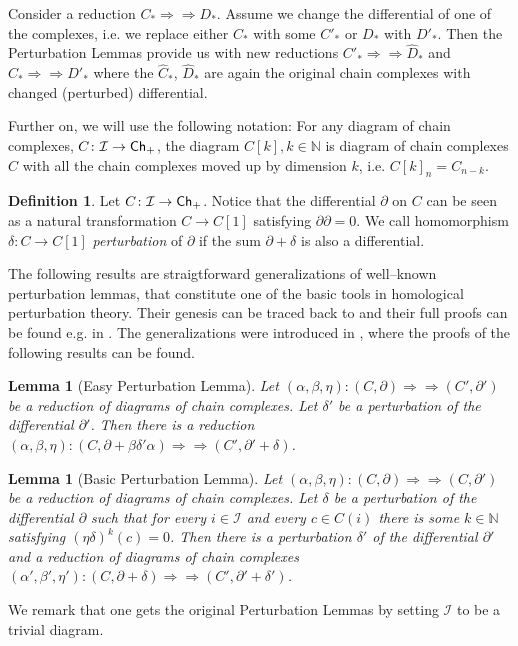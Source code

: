 \documentclass[12pt,a4wide]{article}
\theoremstyle{plain}
\newtheorem{lem}[thm]{Lemma}
\theoremstyle{definition}
\newtheorem{Def}[thm]{Definition}
\newcommand{\heading}[1]{\vspace{1ex}\par\noindent{\bf\boldmath #1}}
\renewcommand\:{\colon}
\def\bo{\partial} %
\newcommand{\dC}{{C}}
\newcommand{\icat}{\mathcal I}
\newcommand\Redu{\Rightarrow\!\!\!\!\Rightarrow}
\begin{document}
\heading{Perturbation lemmas}


Consider a reduction $C_* \Redu D_*$. Assume we change the differential of one of the complexes, i.e. we replace either $C_*$ with some $C'_*$ or $D_*$ with $D'_*$. Then the Perturbation Lemmas provide us with new reductions $C'_* \Redu  \widehat{D}_*$ and $\widehat{C}_* \Redu  D'_*$ where the $\widehat{C}_*$, $\widehat{D}_*$ are again the original chain complexes with changed (perturbed) differential.

Further on, we will use the following notation: For any diagram of chain complexes, $\dC \: \icat \to \Ch_+$, the diagram $\dC[k], k\in \mathbb{N}$ is diagram of chain complexes $\dC$ with all the chain complexes moved up by dimension $k$, i.e. $\dC[k]_n = \dC_{n-k}$.

\begin{Def}
Let $\dC \colon \icat \to \Ch_+$. Notice that the differential $\bo$ on $\dC$ can be seen as a natural transformation $\dC \to \dC [1]$ satisfying $\bo\bo = 0$. We call homomorphism $\delta : \dC \to \dC[1] $ \emph{perturbation} of $\bo$ if the sum $\bo + \delta$ is also a differential.
\end{Def}

The following results are straigtforward generalizations of well--known perturbation lemmas,  that constitute one of the basic tools in homological perturbation theory. Their genesis can be traced back to \cite{eml1, rbrown, shih} and their full proofs can be found e.g. in \cite{serg}. The generalizations were introduced in \cite{filak}, where the proofs of the following results can be found.



\begin{lem}[Easy Perturbation Lemma] \label{lem:epl}
Let $(\alpha,\beta,\eta) \colon (\dC, \bo)\Redu  (\dC',\bo')$ be a reduction of diagrams of chain complexes. Let $\delta'$ be a perturbation of the differential $\bo'$. Then there is a reduction $(\alpha,\beta,\eta) \colon (\dC, \bo + \beta \delta' \alpha) \Redu  (\dC',\bo' + \delta)$.
\end{lem}
\begin{lem}[Basic Perturbation Lemma] \label{lem:bpl}
Let $(\alpha,\beta,\eta) \colon (\dC, \bo)\Redu  (\dC,\bo')$ be a reduction of diagrams of chain complexes. Let $\delta$ be a perturbation of the differential $\bo$ such that for every $i\in \icat$ and every $c \in \dC (i)$ there is some $k \in \mathbb{N}$ satisfying $(\eta\delta)^{k} (c) = 0$. Then there is a perturbation $\delta'$ of the differential $\bo'$ and a reduction of diagrams of chain complexes
 $(\alpha',\beta',\eta') \colon (\dC, \bo + \delta) \Redu  (\dC' ,\bo' + \delta')$.
\end{lem}
 We remark that one gets the original Perturbation Lemmas by setting $\icat$ to be a trivial diagram.
 
\end{document}
